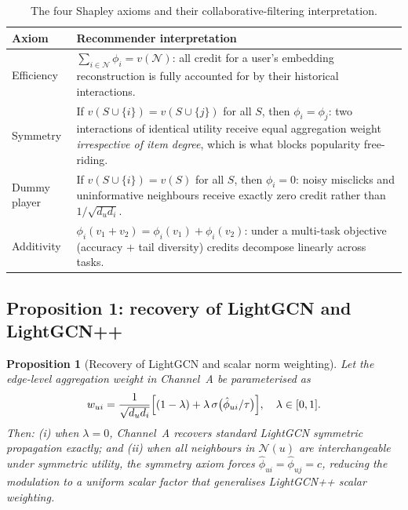 \documentclass[final,5p,times,twocolumn]{elsarticle}
\newtheorem{proposition}{Proposition}
\begin{document}
\begin{table}[t]
\centering
\caption{The four Shapley axioms and their collaborative-filtering
interpretation.}
\label{tab:axioms}
\footnotesize
\begin{tabular}{p{1.15cm}p{6.1cm}}
\toprule
\textbf{Axiom} & \textbf{Recommender interpretation} \\
\midrule
Efficiency & $\sum_{i \in \mathcal{N}} \phi_i = v(\mathcal{N})$: all credit
for a user's embedding reconstruction is fully accounted for by their
historical interactions. \\
Symmetry & If $v(S \cup \{i\}) = v(S \cup \{j\})$ for all $S$, then $\phi_i =
\phi_j$: two interactions of identical utility receive equal aggregation
weight \emph{irrespective of item degree}, which is what blocks popularity
free-riding. \\
Dummy player & If $v(S \cup \{i\}) = v(S)$ for all $S$, then $\phi_i = 0$:
noisy misclicks and uninformative neighbours receive exactly zero credit
rather than $1/\sqrt{d_u d_i}$. \\
Additivity & $\phi_i(v_1 + v_2) = \phi_i(v_1) + \phi_i(v_2)$: under a
multi-task objective (accuracy $+$ tail diversity) credits decompose linearly
across tasks. \\
\bottomrule
\end{tabular}
\end{table}

\subsection{Proposition 1: recovery of LightGCN and LightGCN++}
\label{sec:prop1}

\begin{proposition}[Recovery of LightGCN and scalar norm weighting]
\label{prop:recovery}
Let the edge-level aggregation weight in Channel~A be parameterised as
\begin{equation}
w_{ui} = \frac{1}{\sqrt{d_u d_i}}
\Bigl[ (1-\lambda) + \lambda\, \sigma\bigl(\hat{\phi}_{ui}/\tau\bigr) \Bigr],
\quad \lambda \in [0,1].
\label{eq:edgeweight}
\end{equation}
Then: (i) when $\lambda = 0$, Channel~A recovers standard LightGCN symmetric
propagation exactly; and (ii) when all neighbours in $\mathcal{N}(u)$ are
interchangeable under symmetric utility, the symmetry axiom forces
$\hat{\phi}_{ui} = \hat{\phi}_{uj} = c$, reducing the modulation to a uniform
scalar factor that generalises LightGCN++ scalar weighting.
\end{proposition}
\end{document}

